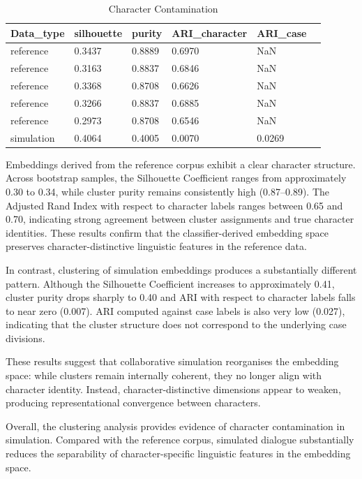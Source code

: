 \documentclass{article}
\begin{document}
\begin{table}[H]
\centering
\begin{tabular}{l l l l l l}\toprule
Data\_type& silhouette & purity & ARI\_character & ARI\_case \\\midrule
reference & 0.3437 & 0.8889 & 0.6970 & NaN \\
reference & 0.3163 & 0.8837 & 0.6846 & NaN \\
reference & 0.3368 & 0.8708 & 0.6626 & NaN \\
reference & 0.3266 & 0.8837 & 0.6885 & NaN \\
reference & 0.2973 & 0.8708 & 0.6546 & NaN \\
simulation & 0.4064 & 0.4005 & 0.0070 & 0.0269 \\ \bottomrule
\end{tabular}
\caption{Character Contamination}
\label{clustering}
\end{table}

Embeddings derived from the reference corpus exhibit a clear character structure. Across bootstrap samples, the Silhouette Coefficient ranges from approximately 0.30 to 0.34, while cluster purity remains consistently high (0.87–0.89). The Adjusted Rand Index with respect to character labels ranges between 0.65 and 0.70, indicating strong agreement between cluster assignments and true character identities. These results confirm that the classifier-derived embedding space preserves character-distinctive linguistic features in the reference data.

In contrast, clustering of simulation embeddings produces a substantially different pattern. Although the Silhouette Coefficient increases to approximately 0.41, cluster purity drops sharply to 0.40 and ARI with respect to character labels falls to near zero (0.007). ARI computed against case labels is also very low (0.027), indicating that the cluster structure does not correspond to the underlying case divisions.

These results suggest that collaborative simulation reorganises the embedding space: while clusters remain internally coherent, they no longer align with character identity. Instead, character-distinctive dimensions appear to weaken, producing representational convergence between characters.

Overall, the clustering analysis provides evidence of character contamination in simulation. Compared with the reference corpus, simulated dialogue substantially reduces the separability of character-specific linguistic features in the embedding space.
\end{document}
